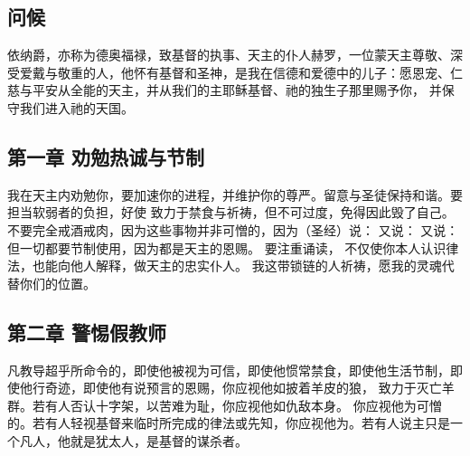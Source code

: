 
\subsection{问候}

依纳爵，亦称为德奥福禄，致基督的执事、天主的仆人赫罗，一位蒙天主尊敬、深受爱戴与敬重的人，他怀有基督和圣神，是我在信德和爱德中的儿子：愿恩宠、仁慈与平安从全能的天主，并从我们的主耶稣基督、祂的独生子那里赐予你， 并保守我们进入祂的天国。\par


\subsection{第一章 劝勉热诚与节制}

我在天主内劝勉你，要加速你的进程，并维护你的尊严。留意与圣徒保持和谐。要担当软弱者的负担，好使 致力于禁食与祈祷，但不可过度，免得因此毁了自己。不要完全戒酒戒肉，因为这些事物并非可憎的，因为（圣经）说： 又说： 又说： 但一切都要节制使用，因为都是天主的恩赐。 要注重诵读， 不仅使你本人认识律法，也能向他人解释，做天主的忠实仆人。 我这带锁链的人祈祷，愿我的灵魂代替你们的位置。\par


\subsection{第二章 警惕假教师}

凡教导超乎所命令的，即使他被视为可信，即使他惯常禁食，即使他生活节制，即使他行奇迹，即使他有说预言的恩赐，你应视他如披着羊皮的狼， 致力于灭亡羊群。若有人否认十字架，以苦难为耻，你应视他如仇敌本身。 你应视他为可憎的。若有人轻视基督来临时所完成的律法或先知，你应视他为。若有人说主只是一个凡人，他就是犹太人，是基督的谋杀者。\par

